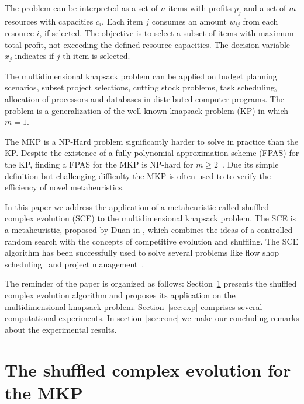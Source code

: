 \documentclass[10pt,conference, compsocconf]{IEEEtran}
\begin{document}
The problem can be interpreted as a set of $n$ items with profits $p_j$
and a set of $m$ resources with capacities $c_i$.
Each item $j$ consumes an amount $w_{ij}$ from each resource $i$, if selected.
The objective is to select a subset of items with maximum total profit,
not exceeding the defined resource capacities.
The decision variable $x_j$ indicates if $j$-th item is selected.

The multidimensional knapsack problem can be applied on budget planning 
scenarios, subset project selections, cutting stock problems, task scheduling,
allocation of processors and databases in distributed computer programs.
The problem is a generalization of the well-known knapsack problem (KP) in which
$m = 1$.

The MKP is a NP-Hard problem significantly harder to solve in practice than the KP.
Despite the existence of a fully polynomial approximation scheme (FPAS) for the KP,
finding a FPAS for the MKP is NP-hard for $m \geqslant 2$~\cite{magazine1984note}.
Due its simple definition but challenging difficulty the MKP is often used to
to verify the efficiency of novel metaheuristics.


In this paper we address the application of a metaheuristic called
shuffled complex evolution (SCE) to the multidimensional knapsack problem.
The SCE is a metaheuristic, proposed by Duan in \cite{duan1992effective},
which combines the ideas of a controlled random search with the concepts
of competitive evolution and shuffling.
The SCE algorithm has been successfully used to solve several problems
like flow shop scheduling~\cite{zhao2014shuffled} and project management~\cite{elbeltagi2007modified}.

The reminder of the paper is organized as follows:
Section~\ref{sec:sce} presents the shuffled complex evolution algorithm
and proposes its application on the multidimensional knapsack problem.
Section~\ref{sec:exp} comprises several computational experiments.
In section~\ref{sec:conc} we make our concluding remarks about the experimental
results.

\section{The shuffled complex evolution for the MKP}
\label{sec:sce}
\end{document}
